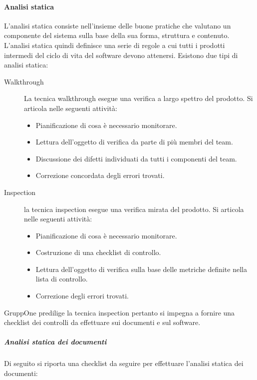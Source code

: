 \documentclass[../../norme-di-progetto.tex]{subfiles}
\begin{document}
\paragraph{Analisi statica}%
\label{par:analisi_statica}
L'analisi statica consiste nell'insieme delle buone pratiche che valutano un componente del sistema sulla base della sua forma, struttura e contenuto.
L'analisi statica quindi definisce una serie di regole a cui tutti i prodotti intermedi del ciclo di vita del software devono attenersi. Esistono due tipi di analisi statica:
\begin{description}
  \item [Walkthrough] La tecnica walkthrough esegue una verifica a largo spettro del prodotto. Si articola nelle seguenti attività:
        \begin{itemize}
          \item Pianificazione di cosa è necessario monitorare.
          \item Lettura dell'oggetto di verifica da parte di più membri del team.
          \item Discussione dei difetti individuati da tutti i componenti del team.
          \item Correzione concordata degli errori trovati.
        \end{itemize}
  \item [Inspection] la tecnica inspection esegue una verifica mirata del prodotto. Si articola nelle seguenti attività:
        \begin{itemize}
          \item Pianificazione di cosa è necessario monitorare.
          \item Costruzione di una checklist di controllo.
          \item Lettura dell'oggetto di verifica sulla base delle metriche definite nella lista di controllo.
          \item Correzione degli errori trovati.
        \end{itemize}
\end{description}
GruppOne predilige la tecnica inspection pertanto si impegna a fornire una checklist dei controlli da effettuare sui documenti e sul software.

\subparagraph{Analisi statica dei documenti}%
\label{subp:analisi_statica_dei_documenti}
Di seguito si riporta una checklist da seguire per effettuare l'analisi statica dei documenti:
\end{document}
